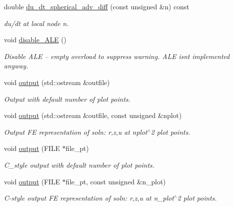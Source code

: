 \begin{DoxyCompactItemize}
double \hyperlink{classoomph_1_1SphericalAdvectionDiffusionEquations_a5159b68db86351eba5efa89f4c922745}{du\+\_\+dt\+\_\+spherical\+\_\+adv\+\_\+diff} (const unsigned \&n) const
\begin{DoxyCompactList}\small\item\em du/dt at local node n. \end{DoxyCompactList}\item 
void \hyperlink{classoomph_1_1SphericalAdvectionDiffusionEquations_a097613909cb9b016e55190df3c7b3d2f}{disable\+\_\+\+A\+LE} ()
\begin{DoxyCompactList}\small\item\em Disable A\+LE -- empty overload to suppress warning. A\+LE isn\textquotesingle{}t implemented anyway. \end{DoxyCompactList}\item 
void \hyperlink{classoomph_1_1SphericalAdvectionDiffusionEquations_a4b4f59d82dd7b2e1641eba4b91d54d40}{output} (std\+::ostream \&outfile)
\begin{DoxyCompactList}\small\item\em Output with default number of plot points. \end{DoxyCompactList}\item 
void \hyperlink{classoomph_1_1SphericalAdvectionDiffusionEquations_a0223fcc7ace17c16b0e61c75ddff8bc5}{output} (std\+::ostream \&outfile, const unsigned \&nplot)
\begin{DoxyCompactList}\small\item\em Output FE representation of soln\+: r,z,u at nplot$^\wedge$2 plot points. \end{DoxyCompactList}\item 
void \hyperlink{classoomph_1_1SphericalAdvectionDiffusionEquations_a5e2334112c6c967c490fc9e5f54f5b35}{output} (F\+I\+LE $\ast$file\+\_\+pt)
\begin{DoxyCompactList}\small\item\em C\+\_\+style output with default number of plot points. \end{DoxyCompactList}\item 
void \hyperlink{classoomph_1_1SphericalAdvectionDiffusionEquations_a79afec7f557484e3b17cc969f4a1ea1f}{output} (F\+I\+LE $\ast$file\+\_\+pt, const unsigned \&n\+\_\+plot)
\begin{DoxyCompactList}\small\item\em C-\/style output FE representation of soln\+: r,z,u at n\+\_\+plot$^\wedge$2 plot points. \end{DoxyCompactList}\item 

\end{DoxyCompactItemize}
